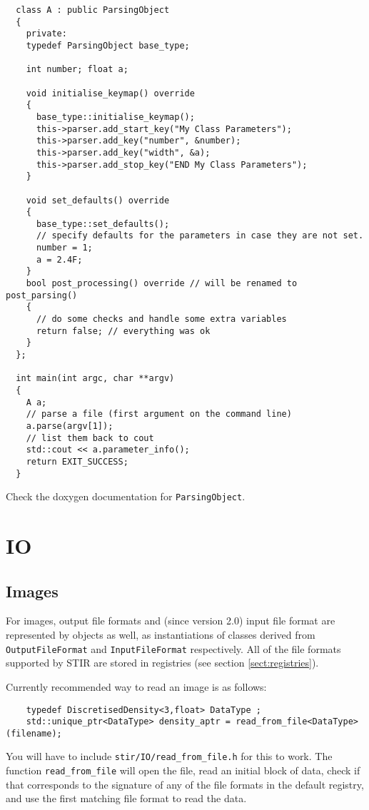 \documentclass{article}
\begin{document}
\begin{verbatim}
  class A : public ParsingObject
  {
    private:
    typedef ParsingObject base_type;

    int number; float a;

    void initialise_keymap() override
    {
      base_type::initialise_keymap();
      this->parser.add_start_key("My Class Parameters");
      this->parser.add_key("number", &number);
      this->parser.add_key("width", &a);
      this->parser.add_stop_key("END My Class Parameters");
    }

    void set_defaults() override
    {
      base_type::set_defaults();
      // specify defaults for the parameters in case they are not set.
      number = 1;
      a = 2.4F;
    }
    bool post_processing() override // will be renamed to post_parsing()
    {
      // do some checks and handle some extra variables
      return false; // everything was ok
    }
  };

  int main(int argc, char **argv)
  {
    A a;
    // parse a file (first argument on the command line)
    a.parse(argv[1]);
    // list them back to cout
    std::cout << a.parameter_info();
    return EXIT_SUCCESS;
  }
\end{verbatim}

Check the doxygen documentation for
\texttt{ParsingObject}.

\section{
IO \label{sect:IO}}

\subsection{Images}
For images, output file formats and (since version 2.0) input file format are represented 
by objects as well, as instantiations of classes derived from 
\texttt{OutputFileFormat} and \texttt{InputFileFormat} respectively. All of
the file formats supported by STIR are stored in registries (see section \ref{sect:registries}).

Currently recommended way to read an image is as follows:
\begin{verbatim}
    typedef DiscretisedDensity<3,float> DataType ;
    std::unique_ptr<DataType> density_aptr = read_from_file<DataType>(filename);
\end{verbatim}
You will have to include \texttt{stir/IO/read\_from\_file.h} for this to work. The function
\texttt{read\_from\_file} will open the file, read an initial block of data, check
if that corresponds to the signature of any of the file formats in the
default registry, and use the first matching file format to read the data.
\end{document}
